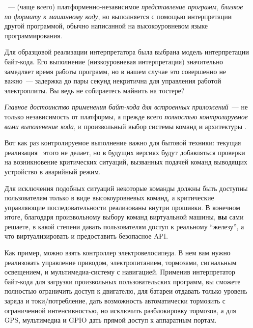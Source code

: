 \clearpage
{}\label{bc}\secdown

\begin{framed}\noindent
{}\ --- (чаще вcего) платформенно-независимое
\emph{представление программ, близкое по формату к машинному коду}, но
выполняется с помощью интерпретации другой программой, обычно написанной на
высокоуровневом языке программирования.
\end{framed}

Для образцовой реализации интерпретатора была выбрана модель интерпретации
байт-кода. Его выполнение (низкоуровневая интерпретация) значительно замедляет
время работы программ, но в нашем случае это совершенно не важно\ --- задержка
до пары секунд некритична для управления работой электроплиты. Вы ведь не
собираетесь майнить на тостере?

\clearpage
\emph{Главное достоинство применения байт-кода для встроенных приложений}\ ---
не только независимость от платформы, а прежде всего \emph{полностью контролируемое вами
выполенение кода}, и произвольный выбор системы команд и архитектуры
.

Вот как раз контролируемое выполнение важно для бытовой техники: текущая
реализация \kf\ этого не делает, но в будущих версиях будут добавляться проверки
на возникновение критических ситуаций, вызванных подачей команд выводящих
устройство в аварийный режим.

Для исключения подобных ситуаций некоторые команды должны быть доступны
пользователям только в виде высокоуровневых команд, а критические управляющие
последовательности реализованы внутри прошивки. В конечном итоге, благодаря
произвольному выбору команд виртуальной машины, \textbf{вы} сами решаете, в
какой степени давать пользователям доступ к реальному ``железу'', а что
виртуализировать и предоставить безопасное API.

Как пример, можно взять контроллер электровелосипеда.
В нем вам нужно реализовать управление приводом, электропитанием, тормозами,
сигнальным освещением, и мультимедиа-систему с навигацией. Применив
интерпретатор байт-кода для загрузки произвольных пользовательских программ, вы
сможете полностью ограничить доступ к двигателю, для батареи отдавать только
уровень заряда и токи/потребление, дать возможность автоматически тормозить с
ограниченной интенсивностью, но исключить разблокировку тормозов, а для GPS,
мультимедиа и GPIO дать прямой доступ к аппаратным портам.

